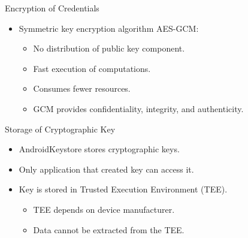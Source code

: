 \documentclass{beamer}
\begin{document}
\begin{frame}{Encryption of Credentials}
\vspace{-5mm}
\begin{itemize}
	\item Symmetric key encryption algorithm AES-GCM:
	\begin{itemize}
		\item No distribution of public key component.
		\item Fast execution of computations.
		\item Consumes fewer resources.
		\item GCM provides confidentiality, integrity, and authenticity.
	\end{itemize} 
\end{itemize}
\end{frame}


\begin{frame}{Storage of Cryptographic Key}
\vspace{-5mm}
	\begin{itemize}
	\item AndroidKeystore stores cryptographic keys.
	\item Only application that created key can access it.
	\item Key is stored in Trusted Execution Environment (TEE).
		\begin{itemize}
		\item TEE depends on device manufacturer.
		\item Data cannot be extracted from the TEE.
		\end{itemize}
\end{itemize}
\end{frame}
\end{document}
